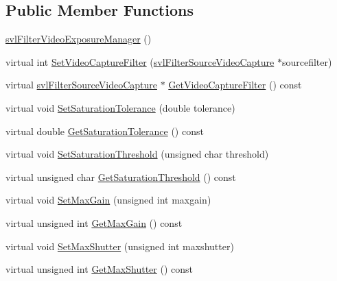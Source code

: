 \subsection*{Public Member Functions}
\begin{DoxyCompactItemize}
\item 
\hyperlink{classsvl_filter_video_exposure_manager_aee6501625b5da7e0d1ccf214df9e8718}{svl\+Filter\+Video\+Exposure\+Manager} ()
\item 
virtual int \hyperlink{classsvl_filter_video_exposure_manager_ac4752946ce8c27aa0ef73e4cdaaec5c9}{Set\+Video\+Capture\+Filter} (\hyperlink{classsvl_filter_source_video_capture}{svl\+Filter\+Source\+Video\+Capture} $\ast$sourcefilter)
\item 
virtual \hyperlink{classsvl_filter_source_video_capture}{svl\+Filter\+Source\+Video\+Capture} $\ast$ \hyperlink{classsvl_filter_video_exposure_manager_a4192edd57895da5cb3081c472f044b48}{Get\+Video\+Capture\+Filter} () const 
\item 
virtual void \hyperlink{classsvl_filter_video_exposure_manager_a6bfb1a6bab6882ddd448a1ee5b5406e0}{Set\+Saturation\+Tolerance} (double tolerance)
\item 
virtual double \hyperlink{classsvl_filter_video_exposure_manager_ae984963200bcf2fbdb1b40d42df4335a}{Get\+Saturation\+Tolerance} () const 
\item 
virtual void \hyperlink{classsvl_filter_video_exposure_manager_a3750e525f8fd7675dccf30a126342cc7}{Set\+Saturation\+Threshold} (unsigned char threshold)
\item 
virtual unsigned char \hyperlink{classsvl_filter_video_exposure_manager_a1ba163365e52a1dd21929ae7574a51b4}{Get\+Saturation\+Threshold} () const 
\item 
virtual void \hyperlink{classsvl_filter_video_exposure_manager_a56e877b051b622038a19b6b99af5946f}{Set\+Max\+Gain} (unsigned int maxgain)
\item 
virtual unsigned int \hyperlink{classsvl_filter_video_exposure_manager_aeb9862e63a3baaaaa7ce54ee8102775d}{Get\+Max\+Gain} () const 
\item 
virtual void \hyperlink{classsvl_filter_video_exposure_manager_ae7a5bbc3333df726f48510459445f524}{Set\+Max\+Shutter} (unsigned int maxshutter)
\item 
virtual unsigned int \hyperlink{classsvl_filter_video_exposure_manager_a36b3cbe18e865d2ad232d9a6a5114c43}{Get\+Max\+Shutter} () const 
\end{DoxyCompactItemize}
